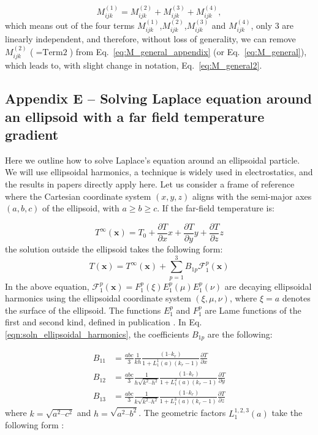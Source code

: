 \documentclass{jfm}
\begin{document}
\begin{equation}
    M_{ijk}^{(1)} = M_{ijk}^{(2)}+M_{ijk}^{(3)}+M_{ijk}^{(4)},
\end{equation}
which means out of the four terms $M_{ijk}^{(1)}$,$M_{ijk}^{(2)}$,$M_{ijk}^{(3)}$ and $M_{ijk}^{(4)}$, only $3$ are linearly independent, and therefore, without loss of generality, we can remove $M_{ijk}^{(2)}$ ($=\text{Term2}$) from Eq.~\eqref{eq:M_general_appendix} (or Eq.~\eqref{eq:M_general}), which leads to, with slight change in notation, Eq.~\eqref{eq:M_general2}.

\subsection{Appendix E -- Solving Laplace equation around an ellipsoid with a far field temperature gradient}

Here we outline how to solve Laplace’s equation around an ellipsoidal particle.  We will use ellipsoidal harmonics, a technique is widely used in electrostatics, and the results in papers \citep{Ellipsoidal_Harmonics1} directly apply here.  Let us consider a frame of reference where the Cartesian coordinate system $(x,y,z)$ aligns with the semi-major axes $(a,b,c)$ of the ellipsoid, with $a \geq b \geq c$.  If the far-field temperature is:

\begin{equation}
T^{\infty}(\boldsymbol{x}) = T_0 + \frac{\partial T}{\partial x} x + \frac{\partial T}{\partial y} y + \frac{\partial T}{\partial z} z
\end{equation}
the solution outside the ellipsoid takes the following form:
\begin{equation} \label{eqn:soln_ellipsoidal_harmonics}
T(\boldsymbol{x}) = T^{\infty}(\boldsymbol{x}) + \sum_{p=1}^3 B_{1p} \mathcal{F}_1^p(\boldsymbol{x})
\end{equation}
In the above equation, $\mathcal{F}_1^p(\boldsymbol{x}) = F_1^p(\xi) E_1^p(\mu) E_1^p(\nu) $ are decaying ellipsoidal harmonics using the ellipsoidal coordinate system $(\xi, \mu,\nu)$, where $\xi = a$ denotes the surface of the ellipsoid.  The functions $E_1^p$ and $F_1^p$ are Lame functions of the first and second kind, defined in publication \citep{Ellipsoidal_Harmonics1}.  In Eq. \eqref{eqn:soln_ellipsoidal_harmonics}, the coefficients $B_{1p}$ are the following:

\begin{subequations}
\begin{align}
B_{11} &= \frac{abc}{3} \frac{1}{kh} \frac{ (1 – k_r)}{1 + L_1^1(a) (k_r -1)} \frac{\partial T}{\partial x}  \\
B_{12} &= \frac{abc}{3} \frac{1}{h\sqrt{k^2 – h^2}} \frac{ (1 – k_r)}{1 + L_1^2(a) (k_r -1)} \frac{\partial T}{\partial y} \\
B_{13} &= \frac{abc}{3} \frac{1}{k \sqrt{k^2 – h^2}} \frac{ (1 – k_r)}{1 + L_1^3(a) (k_r -1)} \frac{\partial T}{\partial z}
\end{align}    
\end{subequations}
where $k = \sqrt{a^2 – c^2}$ and $h = \sqrt{a^2 – b^2}$.  The geometric factors $L_1^{1,2,3}(a)$ take the following form \citep{Ellipsoidal_Harmonics1}:
\end{document}
